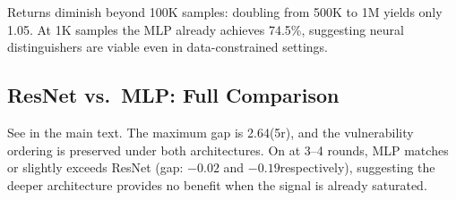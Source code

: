Returns diminish beyond 100K samples: doubling from 500K to 1M yields only 1.05\pp.
At 1K samples the MLP already achieves 74.5\%, suggesting neural distinguishers are viable even in data-constrained settings.

\FloatBarrier
\subsection{ResNet vs.\ MLP: Full Comparison}

See  in the main text.
The maximum gap is 2.64\pp (\present 5r), and the vulnerability ordering is preserved under both architectures.
On \present at 3--4 rounds, MLP matches or slightly exceeds ResNet (gap: $-0.02$ and $-0.19$\pp respectively), suggesting the deeper architecture provides no benefit when the signal is already saturated.
